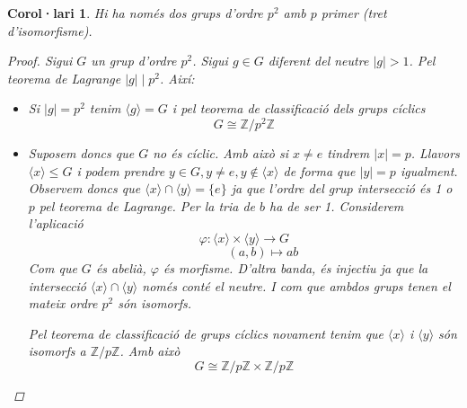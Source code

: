 \documentclass[a4paper,11pt]{report}
\renewcommand{\div}{\mid}
\newcommand{\ordre}[1]{|#1|}
\theoremstyle{theorem}
\newtheorem{col}{\normalfont \sffamily\bfseries Corol·lari}[section]
\theoremstyle{definition}
\begin{document}
\begin{col}
	Hi ha només dos grups d'ordre $p^2$ amb $p$ primer (tret d'isomorfisme).
	\begin{proof}
		Sigui $G$ un grup d'ordre $p^2$. Sigui $g\in G$ diferent del neutre $\ordre{g}>1$. Pel teorema de Lagrange $\ordre{g}\div p^2$. Així:
		\begin{itemize}
			\item Si $\ordre{g}=p^2$ tenim $\langle g\rangle =G$  i pel teorema de classificació dels grups cíclics $$G\cong \mathbb{Z}/p^2\mathbb{Z}$$
			\item Suposem doncs que $G$ no és cíclic. Amb això si $x\neq e$ tindrem $\ordre{x}=p$. Llavors $\langle x\rangle \leq G$ i podem prendre $y\in G,y\neq e,y\notin\langle x\rangle$ de forma que $\ordre{y}=p$ igualment. Observem doncs que $\langle x\rangle\cap\langle y \rangle =\{e\}$ ja que l'ordre del grup intersecció és 1 o $p$ pel teorema de Lagrange. Per la tria de $b$ ha de ser 1.   Considerem l'aplicació $$\varphi:\langle x\rangle \times \langle y\rangle \longrightarrow G$$ $$\qquad\quad(a,b)\longmapsto ab$$
			Com que $G$ és abelià, $\varphi$ és morfisme. D'altra banda, és injectiu ja que la intersecció $\langle x\rangle\cap\langle y \rangle$ només conté el neutre. I com que ambdos grups tenen el mateix ordre $p^2$ són isomorfs. 
			
			Pel teorema de classificació de grups cíclics novament tenim que $\langle x\rangle$ i $\langle y \rangle$ són isomorfs a $\mathbb{Z}/p\mathbb{Z}$. Amb això
			$$G\cong\mathbb{Z}/p\mathbb{Z}\times\mathbb{Z}/p\mathbb{Z}$$
		\end{itemize}
	\end{proof}
\end{col}
\end{document}
